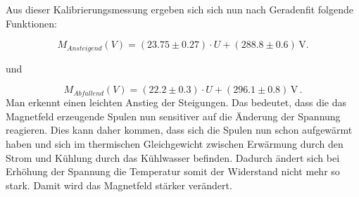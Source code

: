 \documentclass{scrartcl}
\begin{document}
Aus dieser Kalibrierungsmessung ergeben sich sich nun nach Geradenfit folgende Funktionen:

\begin{equation}
    M_{Ansteigend}(V) = (23.75 \pm 0.27)  \cdot U + (288.8 \pm 0.6) \, \mathrm{V} .
    \label{KalibrierungsfunktionAnsteigend}
\end{equation}
\begin{centering}
und
\end{centering}
\begin{equation}
    M_{Abfallend}(V) = (22.2 \pm 0.3) \cdot U + (296.1 \pm 0.8) \, \mathrm{V} \, .
    \label{KalibrierungsfunktionAbfallend}
\end{equation}
Man erkennt einen leichten Anstieg der Steigungen. Das bedeutet, dass die das Magnetfeld erzeugende Spulen nun sensitiver auf die Änderung der Spannung reagieren. Dies kann daher kommen, dass sich die Spulen nun schon aufgewärmt haben und sich im thermischen Gleichgewicht zwischen Erwärmung durch den Strom und Kühlung durch das Kühlwasser befinden. Dadurch ändert sich bei Erhöhung der Spannung die Temperatur somit der Widerstand nicht mehr so stark. Damit wird das Magnetfeld stärker verändert. 
\end{document}
